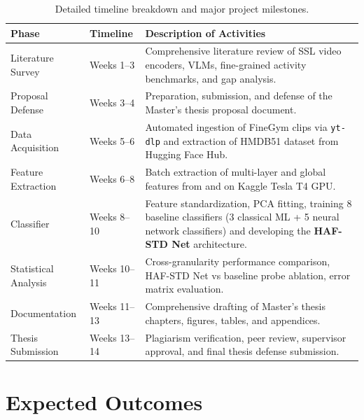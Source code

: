 \begin{table}[H]
\centering
\caption{Detailed timeline breakdown and major project milestones.}
\label{tab:schedule}
\begin{tabular}{llp{7.5cm}}
\toprule
\textbf{Phase} & \textbf{Timeline} & \textbf{Description of Activities} \\
\midrule
Literature Survey & Weeks 1--3 & Comprehensive literature review of SSL video encoders, VLMs, fine-grained activity benchmarks, and gap analysis. \\
Proposal Defense & Weeks 3--4 & Preparation, submission, and defense of the Master's thesis proposal document. \\
Data Acquisition & Weeks 5--6 & Automated ingestion of FineGym clips via \texttt{yt-dlp} and extraction of HMDB51 dataset from Hugging Face Hub. \\
Feature Extraction & Weeks 6--8 & Batch extraction of multi-layer and global features from \vjepaa{} and \qwenvl{} on Kaggle Tesla T4 GPU. \\
Classifier & Weeks 8--10 & Feature standardization, PCA fitting, training 8 baseline classifiers (3 classical ML + 5 neural network classifiers) and developing the \textbf{HAF-STD Net} architecture. \\
Statistical Analysis & Weeks 10--11 & Cross-granularity performance comparison, HAF-STD Net vs baseline probe ablation, error matrix evaluation. \\
Documentation & Weeks 11--13 & Comprehensive drafting of Master's thesis chapters, figures, tables, and appendices. \\
Thesis Submission & Weeks 13--14 & Plagiarism verification, peer review, supervisor approval, and final thesis defense submission. \\
\bottomrule
\end{tabular}
\end{table}

\section{Expected Outcomes}


